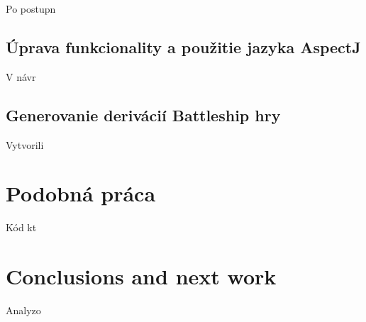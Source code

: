 \documentclass[11pt,slovak,a4paper,twoside]{article}
\begin{document}
Po postupn


\subsection{Úprava funkcionality a použitie jazyka AspectJ} \label{eval-ownDesing}

V návr


\subsection{Generovanie derivácií Battleship hry} \label{eval-javascript}

Vytvorili


\section{Podobná práca} \label{recentwork}

Kód kt


\section{Conclusions and next work} \label{cc}

Analyzo
 


\end{document}
